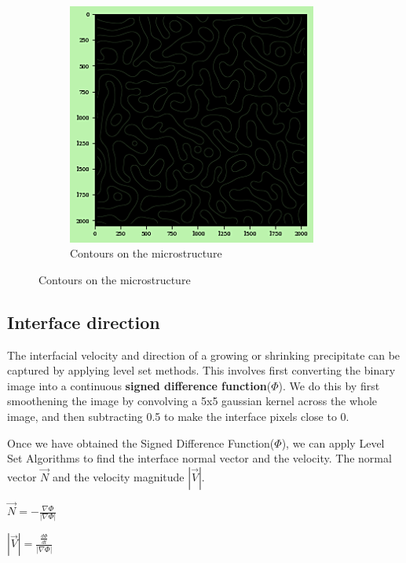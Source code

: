 \documentclass[12pt, a4paper]{report}
\begin{document}
\begin{figure}[H]
\centering
\begin{subfigure}{.6\textwidth}
  \centering
  \includegraphics[width=0.9\textwidth]{Pictures/Level Set/level_set_contours.png}
  \caption{Contours on the microstructure}
  \label{img:microstrImg}
\end{subfigure}
\label{fig:test}
\end{figure}

\subsection{Interface direction}
The interfacial velocity and direction of a growing or shrinking precipitate can be captured by applying level set methods. This involves first converting the binary image into a continuous \textbf{signed difference function}($\Phi$). We do this by first smoothening the image by convolving a 5x5 gaussian kernel across the whole image, and then subtracting 0.5 to make the interface pixels close to 0.  

Once we have obtained the Signed Difference Function($\Phi$), we can apply Level Set Algorithms to find the interface normal vector and the velocity. The normal vector $\vec{N}$ and the velocity magnitude $|\vec{V}|$.

$\vec{N} = -\frac{\nabla\Phi}{|\nabla\Phi|}$

$|\vec{V}| = \frac{\frac{d\Phi}{dt}}{|\nabla\Phi|}$
\end{document}
